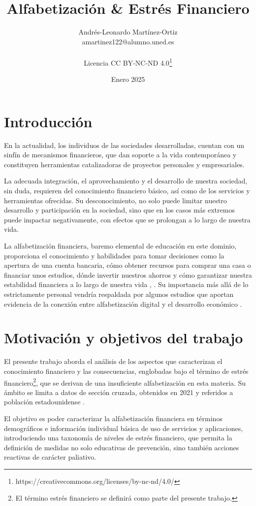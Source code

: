 \documentclass[a4paper, 11pt]{article}
\title{Alfabetización \& Estrés Financiero}
\author{Andrés-Leonardo Martínez-Ortiz \\ amartinez122@alumno.uned.es\\
\\
Licencia CC BY-NC-ND 4.0\footnote{https://creativecommons.org/licenses/by-nc-nd/4.0/ }}
\date{Enero 2025}
\begin{document}
\maketitle
\clearpage
\tableofcontents
\clearpage
\section{Introducción}
\label{sec:introduction}
En la actualidad, los individuos de las sociedades desarrolladas, cuentan con 
un sinfín de mecanismos financieros, que dan soporte a la vida contemporánea
y constituyen herramientas catalizadoras de proyectos personales y empresariales. 

La adecuada integración, el aprovechamiento y el desarrollo de
nuestra sociedad, sin duda, requieren del conocimiento financiero básico, así como
de los servicios y herramientas ofrecidas. Su desconocimiento, no solo puede limitar
nuestro desarrollo y participación en la sociedad, sino que en los casos más extremos
puede impactar negativamente, con efectos que se prolongan a lo largo de nuestra
vida. 

La alfabetización financiera, baremo elemental de educación en este dominio, 
proporciona el conocimiento y habilidades para tomar decisiones como la 
apertura de una cuenta bancaria, cómo obtener recursos para comprar una
casa o financiar unos estudios, dónde invertir nuestros ahorros y cómo 
garantizar nuestra estabilidad financiera a lo largo de nuestra vida
\cite{EU01}, \cite{OCDE01}. Su importancia más allá de lo estrictamente personal 
vendría respaldada por algunos estudios que aportan evidencia de
la conexión entre alfabetización digital y el desarrollo económico \cite{Lusardi14}. 

\section{Motivación y objetivos del trabajo}
\label{sec:motivation}
El presente trabajo aborda el análisis de los aspectos que caracterizan el conocimiento
financiero y las consecuencias, englobadas bajo el término de estrés 
financiero\footnote{El término estrés financiero se definirá como parte del presente 
trabajo.}, que se derivan de una insuficiente alfabetización en esta materia. Su ámbito se 
limita a datos de sección cruzada, obtenidos en 2021 y referidos a población estadounidense 
\cite{NFCS01}.

El objetivo es poder caracterizar la alfabetización financiera en términos demográficos e 
información individual básica de uso de servicios y aplicaciones, introduciendo una taxonomía 
de niveles de estrés financiero, que permita la definición de medidas no solo educativas de 
prevención, sino también acciones reactivas de carácter paliativo.
\end{document}
